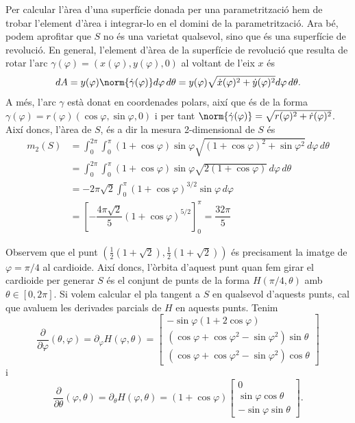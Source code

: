 \documentclass[12pt, a4paper]{article}
\begin{document}
Per calcular l'àrea d'una superfície donada per una parametrització hem de trobar l'element d'àrea i integrar-lo en el domini de la parametrització. Ara bé, podem aprofitar que \( S \) no és una varietat qualsevol, sino que és una superfície de revolució. En general, l'element d'àrea de la superfície de revolució que resulta de rotar l'arc \( \gamma(\varphi) = (x(\varphi), y(\varphi), 0) \) al voltant de l'eix \( x \) és 
\begin{equation}
  dA = y(\varphi)\norm{\dot{\gamma}(\varphi)} d\varphi \, d\theta = y(\varphi)\sqrt{\dot{x}(\varphi)^2 + \dot{y}(\varphi)^2} d\varphi \, d\theta. 
\end{equation}
A més, l'arc \( \gamma \) està donat en coordenades polars, així que és de la forma \( \gamma(\varphi) = r(\varphi) (\cos{\varphi}, \sin{\varphi}, 0) \) i per tant \( \norm{\dot{\gamma}(\varphi)} = \sqrt{r(\varphi)^2 + \dot{r}(\varphi)^2} \). Així doncs, l'àrea de \( S \), és a dir la mesura 2-dimensional de \( S \) és
\begin{align*}
 	m_2(S) &= \int_0^{2\pi} \! \int_0^\pi (1+\cos{\varphi})\sin{\varphi} \sqrt{(1+\cos{\varphi})^2 + \sin{\varphi}^2} \, d\varphi \, d\theta \\	
				 &= \int_0^{2\pi} \! \int_0^\pi (1+\cos{\varphi})\sin{\varphi} \sqrt{2(1 + \cos{\varphi})} \, d\varphi \, d\theta \\
				 &= -2\pi\sqrt{2} \int_0^\pi (1 + \cos{\varphi})^{3/2} \sin{\varphi} \, d\varphi \\ 
				 &= \left[-\dfrac{4\pi\sqrt{2}}{5} (1 + \cos{\varphi})^{5/2}\right]_0^\pi = \dfrac{32\pi}{5} 
\end{align*}

Observem que el punt \( \left(\frac{1}{2}(1+\sqrt{2}),\frac{1}{2}(1+\sqrt{2})\right) \) és precisament la imatge de \( \varphi = \pi/4 \) al cardioide. Així doncs, l'òrbita d'aquest punt quan fem girar el cardioide per generar \( S \) és el conjunt de punts de la forma \( H(\pi/4, \theta) \) amb \( \theta \in [0, 2\pi] \). Si volem calcular el pla tangent a \( S \) en qualsevol d'aquests punts, cal que avaluem les derivades parcials de \( H \) en aquests punts. Tenim
\begin{equation}
	\dfrac{\partial}{\partial \varphi}(\theta,\varphi) = \partial_{\varphi}H(\varphi, \theta) = \begin{bmatrix}
    -\sin{\varphi}(1 + 2\cos{\varphi}) \\
    (\cos{\varphi} + \cos{\varphi}^2 - \sin{\varphi}^2)\sin{\theta} \\
    (\cos{\varphi} + \cos{\varphi}^2 - \sin{\varphi}^2)\cos{\theta} 
  \end{bmatrix} \label{eq:parcial 1}
\end{equation}
i
\begin{equation}
	\dfrac{\partial}{\partial \theta}(\varphi, \theta) = \partial_{\theta}H(\varphi, \theta) = (1 + \cos{\varphi}) \begin{bmatrix}
    0 \\
    \sin{\varphi}\cos{\theta} \\
    -\sin{\varphi}\sin{\theta}
  \end{bmatrix} . \label{eq:parcial 2}
\end{equation}
\end{document}
